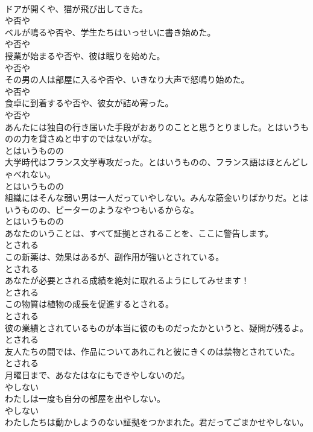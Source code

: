 \documentclass[8pt]{extreport}
\begin{document}
\begin{CJK}{UTF8}{min}
\\	ドアが開くや、猫が飛び出してきた。	
\\	や否や
\\	ベルが鳴るや否や、学生たちはいっせいに書き始めた。	
\\	や否や
\\	授業が始まるや否や、彼は眠りを始めた。	
\\	や否や
\\	その男の人は部屋に入るや否や、いきなり大声で怒鳴り始めた。	
\\	や否や
\\	食卓に到着するや否や、彼女が詰め寄った。	
\\	や否や
\\	あんたには独自の行き届いた手段がおありのことと思うとりました。とはいうものの力を貸さぬと申すのではないがな。	
\\	とはいうものの
\\	大学時代はフランス文学専攻だった。とはいうものの、フランス語はほとんどしゃべれない。	
\\	とはいうものの
\\	組織にはそんな弱い男は一人だっていやしない。みんな筋金いりばかりだ。とはいうものの、ピーターのようなやつもいるからな。	
\\	とはいうものの
\\	あなたのいうことは、すべて証拠とされることを、ここに警告します。	
\\	とされる
\\	この新薬は、効果はあるが、副作用が強いとされている。	
\\	とされる
\\	あなたが必要とされる成績を絶対に取れるようにしてみせます！	
\\	とされる
\\	この物質は植物の成長を促進するとされる。	
\\	とされる
\\	彼の業績とされているものが本当に彼のものだったかというと、疑問が残るよ。	
\\	とされる
\\	友人たちの間では、作品についてあれこれと彼にきくのは禁物とされていた。	
\\	とされる
\\	月曜日まで、あなたはなにもできやしないのだ。	
\\	やしない
\\	わたしは一度も自分の部屋を出やしない。	
\\	やしない
\\	わたしたちは動かしようのない証拠をつかまれた。君だってごまかせやしない。	

\end{CJK}
\end{document}

